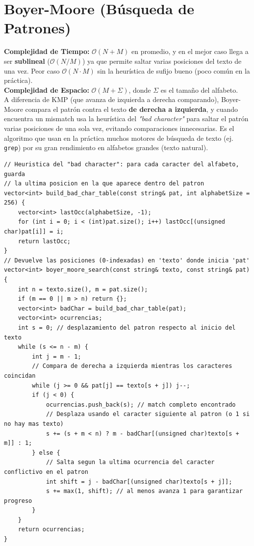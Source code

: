 \documentclass[10pt,twocolumn,letterpaper]{report}
\begin{document}
\section{Boyer-Moore (Búsqueda de Patrones)}
\textbf{Complejidad de Tiempo:} $\mathcal{O}(N + M)$ en promedio, y en el mejor caso llega a ser \textbf{sublineal} ($\mathcal{O}(N/M)$) ya que permite saltar varias posiciones del texto de una vez. Peor caso $\mathcal{O}(N \cdot M)$ sin la heurística de sufijo bueno (poco común en la práctica). \\
\textbf{Complejidad de Espacio:} $\mathcal{O}(M + \Sigma)$, donde $\Sigma$ es el tamaño del alfabeto. \\
A diferencia de KMP (que avanza de izquierda a derecha comparando), Boyer-Moore compara el patrón contra el texto \textbf{de derecha a izquierda}, y cuando encuentra un mismatch usa la heurística del \textit{"bad character"} para saltar el patrón varias posiciones de una sola vez, evitando comparaciones innecesarias. Es el algoritmo que usan en la práctica muchos motores de búsqueda de texto (ej. \texttt{grep}) por su gran rendimiento en alfabetos grandes (texto natural).
\begin{lstlisting}
// Heuristica del "bad character": para cada caracter del alfabeto, guarda
// la ultima posicion en la que aparece dentro del patron
vector<int> build_bad_char_table(const string& pat, int alphabetSize = 256) {
    vector<int> lastOcc(alphabetSize, -1);
    for (int i = 0; i < (int)pat.size(); i++) lastOcc[(unsigned char)pat[i]] = i;
    return lastOcc;
}
// Devuelve las posiciones (0-indexadas) en 'texto' donde inicia 'pat'
vector<int> boyer_moore_search(const string& texto, const string& pat) {
    int n = texto.size(), m = pat.size();
    if (m == 0 || m > n) return {};
    vector<int> badChar = build_bad_char_table(pat);
    vector<int> ocurrencias;
    int s = 0; // desplazamiento del patron respecto al inicio del texto
    while (s <= n - m) {
        int j = m - 1;
        // Compara de derecha a izquierda mientras los caracteres coincidan
        while (j >= 0 && pat[j] == texto[s + j]) j--;
        if (j < 0) {
            ocurrencias.push_back(s); // match completo encontrado
            // Desplaza usando el caracter siguiente al patron (o 1 si no hay mas texto)
            s += (s + m < n) ? m - badChar[(unsigned char)texto[s + m]] : 1;
        } else {
            // Salta segun la ultima ocurrencia del caracter conflictivo en el patron
            int shift = j - badChar[(unsigned char)texto[s + j]];
            s += max(1, shift); // al menos avanza 1 para garantizar progreso
        }
    }
    return ocurrencias;
}
\end{lstlisting}
\end{document}
